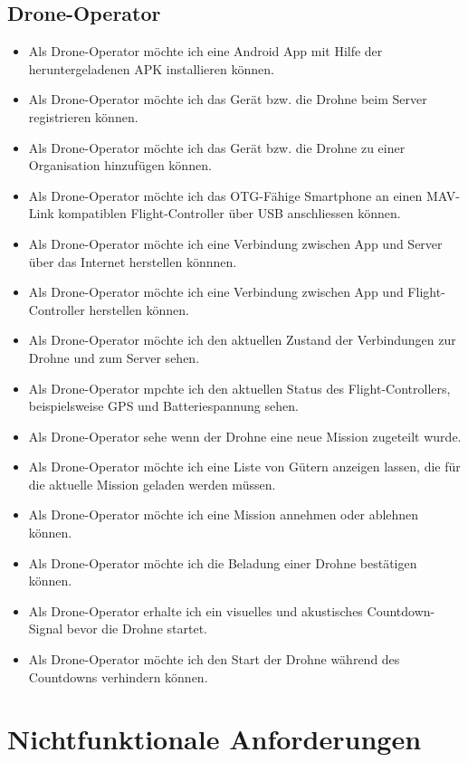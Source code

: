 \subsection{Drone-Operator}
\begin{itemize}
	\item Als Drone-Operator möchte ich eine Android App mit Hilfe der heruntergeladenen APK installieren können.
	\item Als Drone-Operator möchte ich das Gerät bzw. die Drohne beim Server registrieren können.
	\item Als Drone-Operator möchte ich das Gerät bzw. die Drohne zu einer Organisation hinzufügen können.
	\item Als Drone-Operator möchte ich das OTG-Fähige Smartphone an einen MAV-Link kompatiblen Flight-Controller über USB anschliessen können.
	\item Als Drone-Operator möchte ich eine Verbindung zwischen App und Server über das Internet herstellen könnnen.
	\item Als Drone-Operator möchte ich eine Verbindung zwischen App und Flight-Controller herstellen können.
	\item Als Drone-Operator möchte ich den aktuellen Zustand der Verbindungen zur Drohne und zum Server sehen.
	\item Als Drone-Operator mpchte ich den aktuellen Status des Flight-Controllers, beispielsweise GPS und Batteriespannung sehen.
	\item Als Drone-Operator sehe wenn der Drohne eine neue Mission zugeteilt wurde.
	\item Als Drone-Operator möchte ich eine Liste von Gütern anzeigen lassen, die für die aktuelle Mission geladen werden müssen.
	\item Als Drone-Operator möchte ich eine Mission annehmen oder ablehnen können.
	\item Als Drone-Operator möchte ich die Beladung einer Drohne bestätigen können.
	\item Als Drone-Operator erhalte ich ein visuelles und akustisches Countdown-Signal bevor die Drohne startet.
	\item Als Drone-Operator möchte ich den Start der Drohne während des Countdowns verhindern können.
\end{itemize}


\section{Nichtfunktionale Anforderungen}

